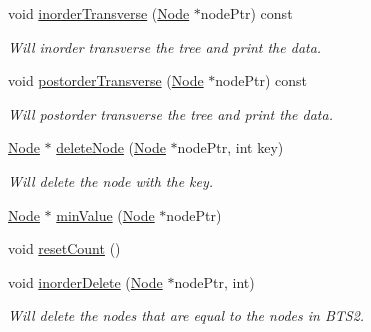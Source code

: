 \begin{DoxyCompactItemize}
void \mbox{\hyperlink{class_node_tree_a3973627c8a390da9b12e4bc9d4a9327d}{inorder\+Transverse}} (\mbox{\hyperlink{class_node}{Node}} $\ast$node\+Ptr) const
\begin{DoxyCompactList}\small\item\em Will inorder transverse the tree and print the data. \end{DoxyCompactList}\item 
void \mbox{\hyperlink{class_node_tree_a09ddf9e2cb245c50952b9669fb328907}{postorder\+Transverse}} (\mbox{\hyperlink{class_node}{Node}} $\ast$node\+Ptr) const
\begin{DoxyCompactList}\small\item\em Will postorder transverse the tree and print the data. \end{DoxyCompactList}\item 
\mbox{\hyperlink{class_node}{Node}} $\ast$ \mbox{\hyperlink{class_node_tree_a4a02f5a4836ed05e0d51e946101982b8}{delete\+Node}} (\mbox{\hyperlink{class_node}{Node}} $\ast$node\+Ptr, int key)
\begin{DoxyCompactList}\small\item\em Will delete the node with the key. \end{DoxyCompactList}\item 
\mbox{\hyperlink{class_node}{Node}} $\ast$ \mbox{\hyperlink{class_node_tree_a71a5469b3871672b409224ee905540c3}{min\+Value}} (\mbox{\hyperlink{class_node}{Node}} $\ast$node\+Ptr)
\item 
void \mbox{\hyperlink{class_node_tree_a4deaf904f4b727579020bcf6cba77a8f}{reset\+Count}} ()
\item 
void \mbox{\hyperlink{class_node_tree_ac57c84edf2b16c3fed7085413b272a62}{inorder\+Delete}} (\mbox{\hyperlink{class_node}{Node}} $\ast$node\+Ptr, int)
\begin{DoxyCompactList}\small\item\em Will delete the nodes that are equal to the nodes in B\+T\+S2. \end{DoxyCompactList}\end{DoxyCompactItemize}
